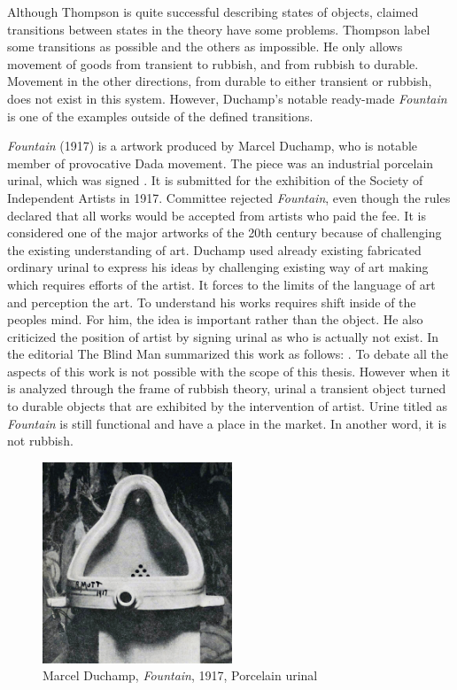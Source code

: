 Although Thompson is quite successful describing states of objects, claimed transitions between states in the theory have some problems. Thompson label some transitions as possible and the others as impossible. He only allows movement of goods from transient to rubbish, and from rubbish to durable. Movement in the other directions, from durable to either transient or rubbish, does not exist in this system. However, Duchamp’s notable ready-made \textit{Fountain} is one of the examples outside of the defined transitions.

\textit{Fountain} (1917) is a artwork produced by Marcel Duchamp, who is notable member of provocative Dada movement. The piece was an industrial porcelain urinal, which was signed . It is submitted for the exhibition of the Society of Independent Artists in 1917. Committee rejected \textit{Fountain}, even though the rules declared that all works would be accepted from artists who paid the fee. It is considered one of the major artworks of the 20th century because of challenging the existing understanding of art. Duchamp used already existing fabricated ordinary urinal to express his ideas by challenging existing way of art making which requires efforts of the artist. It forces to the limits of the language of art and perception the art. To understand his works requires shift inside of the peoples mind. For him, the idea is important rather than the object. He also criticized the position of artist by signing urinal as  who is actually not exist. In the editorial The Blind Man summarized this work as follows:  \citep{duchamp1917mutt}. To debate all the aspects of this work is not possible with the scope of this thesis. However when it is analyzed through the frame of rubbish theory, urinal a transient object turned to durable objects that are exhibited by the intervention of artist. Urine titled as \textit{Fountain} is still functional and have a place in the market. In another word, it is not rubbish.

\begin{figure}[h!]
  \centering
  \includegraphics[height=6cm]{graphics/Duchamp_Fountaine.jpg}
  \caption{Marcel Duchamp, \textit{Fountain}, 1917, Porcelain urinal}
  \label{fig:Duchamp_Fountaine}
\end{figure}



